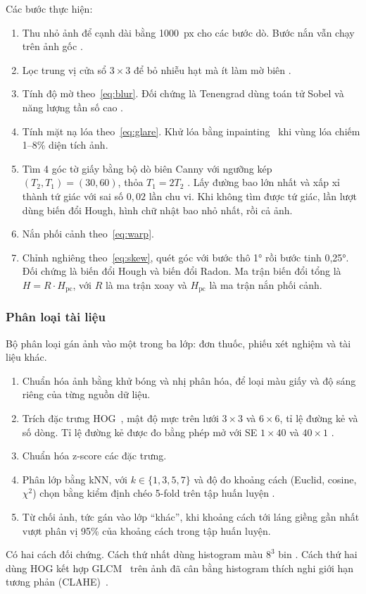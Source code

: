 Các bước thực hiện:
\begin{enumerate}
  \item Thu nhỏ ảnh để cạnh dài bằng \num{1000}~px cho các bước dò.
        Bước nắn vẫn chạy trên ảnh gốc .
  \item Lọc trung vị cửa sổ $3\times3$ để bỏ nhiễu hạt mà ít làm mờ biên .
  \item Tính độ mờ theo~\eqref{eq:blur}.
        Đối chứng là Tenengrad dùng toán tử Sobel  và năng lượng tần số cao .
  \item Tính mặt nạ lóa theo~\eqref{eq:glare}.
        Khử lóa bằng inpainting~\cite{telea2004inpainting} khi vùng lóa chiếm 1--8\% diện tích ảnh.
  \item Tìm 4 góc tờ giấy bằng bộ dò biên Canny với ngưỡng kép $(T_2,T_1)=(30,60)$, thỏa $T_1=2T_2$ .
        Lấy đường bao lớn nhất và xấp xỉ thành tứ giác với sai số $0{,}02$ lần chu vi.
        Khi không tìm được tứ giác, lần lượt dùng biến đổi Hough, hình chữ nhật bao nhỏ nhất, rồi cả ảnh.
  \item Nắn phối cảnh theo~\eqref{eq:warp}.
  \item Chỉnh nghiêng theo~\eqref{eq:skew}, quét góc với bước thô 1° rồi bước tinh 0,25°.
        Đối chứng là biến đổi Hough và biến đổi Radon.
        Ma trận biến đổi tổng là $H=R\cdot H_{\text{pc}}$, với $R$ là ma trận xoay và $H_{\text{pc}}$ là ma trận nắn phối cảnh.
\end{enumerate}

\subsubsection{Phân loại tài liệu}
Bộ phân loại gán ảnh vào một trong ba lớp: đơn thuốc, phiếu xét nghiệm và tài liệu khác.
\begin{enumerate}
  \item Chuẩn hóa ảnh bằng khử bóng và nhị phân hóa, để loại màu giấy và độ sáng riêng của từng nguồn dữ liệu.
  \item Trích đặc trưng HOG~\cite{dalal2005hog}, mật độ mực trên lưới $3\times3$ và $6\times6$, tỉ lệ đường kẻ và số dòng.
        Tỉ lệ đường kẻ được đo bằng phép mở với SE $1\times40$ và $40\times1$ .
  \item Chuẩn hóa z-score các đặc trưng.
  \item Phân lớp bằng kNN, với $k\in\{1,3,5,7\}$ và độ đo khoảng cách (Euclid, cosine, $\chi^2$) chọn bằng kiểm định chéo 5-fold trên tập huấn luyện .
  \item Từ chối ảnh, tức gán vào lớp ``khác'', khi khoảng cách tới láng giềng gần nhất vượt phân vị 95\% của khoảng cách trong tập huấn luyện.
\end{enumerate}
Có hai cách đối chứng.
Cách thứ nhất dùng histogram màu $8^3$ bin .
Cách thứ hai dùng HOG kết hợp GLCM~\cite{haralick1973textural} trên ảnh đã cân bằng histogram thích nghi giới hạn tương phản (CLAHE)~\cite{zuiderveld1994clahe}.

